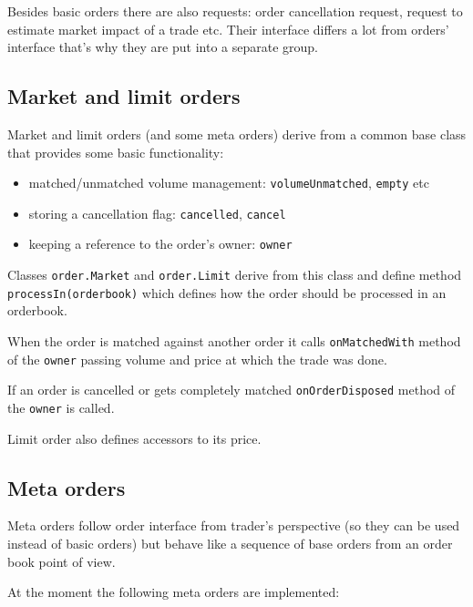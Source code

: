 \documentclass[a4paper,11pt]{article}
\begin{document}
Besides basic orders there are also requests: order cancellation
request, request to estimate market impact of a trade etc. Their
interface differs a lot from orders' interface that's why they are put
into a separate group.

\subsection{Market and limit orders}\label{market-and-limit-orders}

Market and limit orders (and some meta orders) derive from a common base
class that provides some basic functionality:

\begin{itemize}
\itemsep1pt\parskip0pt
\item
  matched/unmatched volume management: \texttt{volumeUnmatched}, \texttt{empty} etc
\item
  storing a cancellation flag: \texttt{cancelled}, \texttt{cancel}
\item
  keeping a reference to the order's owner: \texttt{owner}
\end{itemize}


Classes \texttt{order.Market} and \texttt{order.Limit} derive from this
class and define method \texttt{processIn(orderbook)} which defines how
the order should be processed in an orderbook.

When the order is matched against another order it calls
\texttt{onMatchedWith} method of the \texttt{owner} passing volume and
price at which the trade was done.

If an order is cancelled or gets completely matched
\texttt{onOrderDisposed} method of the \texttt{owner} is called.

Limit order also defines accessors to its price.

\subsection{Meta orders}
Meta orders follow order interface from trader's perspective (so they can be used instead of basic orders) but behave like a sequence of base orders from an order book point of view.

At the moment the following meta orders are implemented:
\end{document}
